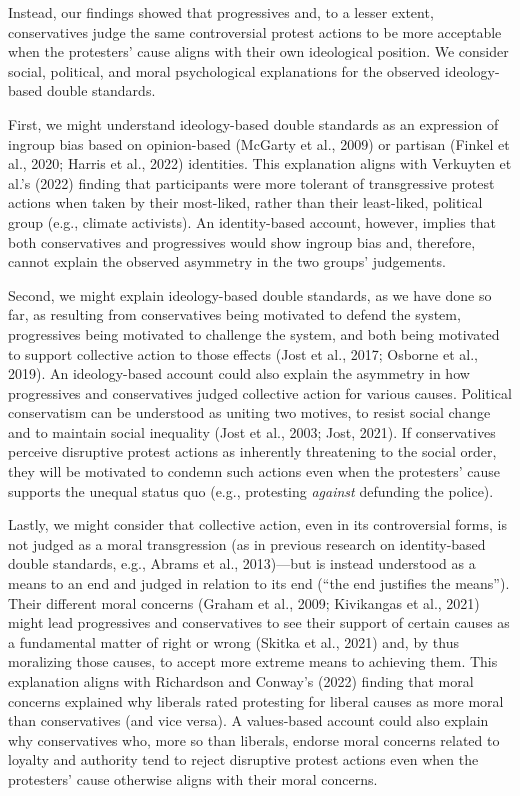 \documentclass[12pt, letterpaper]{article}
\begin{document}
Instead, our findings showed that progressives and, to a lesser extent,
conservatives judge the same controversial protest actions to be more
acceptable when the protesters' cause aligns with their own ideological
position. We consider social, political, and moral psychological
explanations for the observed ideology-based double standards.

First, we might understand ideology-based double standards as an
expression of ingroup bias based on opinion-based (McGarty et al., 2009)
or partisan (Finkel et al., 2020; Harris et al., 2022) identities. This
explanation aligns with Verkuyten et al.'s (2022) finding that
participants were more tolerant of transgressive protest actions when
taken by their most-liked, rather than their least-liked, political
group (e.g., climate activists). An identity-based account, however,
implies that both conservatives and progressives would show ingroup bias
and, therefore, cannot explain the observed asymmetry in the two groups'
judgements.

Second, we might explain ideology-based double standards, as we have
done so far, as resulting from conservatives being motivated to defend
the system, progressives being motivated to challenge the system, and
both being motivated to support collective action to those effects (Jost
et al., 2017; Osborne et al., 2019). An ideology-based account could
also explain the asymmetry in how progressives and conservatives judged
collective action for various causes. Political conservatism can be
understood as uniting two motives, to resist social change and to
maintain social inequality (Jost et al., 2003; Jost, 2021). If
conservatives perceive disruptive protest actions as inherently
threatening to the social order, they will be motivated to condemn such
actions even when the protesters' cause supports the unequal status quo
(e.g., protesting \emph{against} defunding the police).

Lastly, we might consider that collective action, even in its
controversial forms, is not judged as a moral transgression (as in
previous research on identity-based double standards, e.g., Abrams et
al., 2013)---but is instead understood as a means to an end and judged
in relation to its end (``the end justifies the means''). Their
different moral concerns (Graham et al., 2009; Kivikangas et al., 2021)
might lead progressives and conservatives to see their support of
certain causes as a fundamental matter of right or wrong (Skitka et al.,
2021) and, by thus moralizing those causes, to accept more extreme means
to achieving them. This explanation aligns with Richardson and Conway's
(2022) finding that moral concerns explained why liberals rated
protesting for liberal causes as more moral than conservatives (and vice
versa). A values-based account could also explain why conservatives who,
more so than liberals, endorse moral concerns related to loyalty and
authority tend to reject disruptive protest actions even when the
protesters' cause otherwise aligns with their moral concerns.
\end{document}
